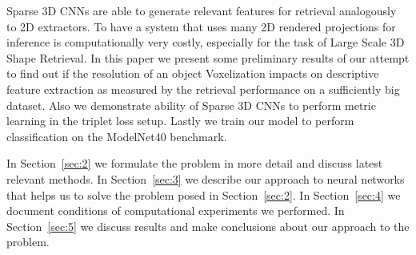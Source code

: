 Sparse 3D CNNs are able to generate relevant features for retrieval analogously to 2D extractors. To have a system that uses many 2D rendered projections for inference is computationally very costly, especially for the task of Large Scale 3D Shape Retrieval. In this paper we present some preliminary results of our attempt to find out if the resolution of an object Voxelization impacts on descriptive feature extraction as measured by the retrieval performance on a sufficiently big dataset. Also we demonstrate ability of Sparse 3D CNNs to perform metric learning in the triplet loss setup. Lastly we train our model to perform classification on the ModelNet40 benchmark.

In Section~\ref{sec:2} we formulate the problem in more detail and discuss latest relevant methods.
In Section~\ref{sec:3} we describe our approach to neural networks that helps us to solve the problem posed in Section~\ref{sec:2}.
In Section~\ref{sec:4} we document conditions of computational experiments we performed.
In Section~\ref{sec:5} we discuss results and make conclusions about our approach to the problem.


